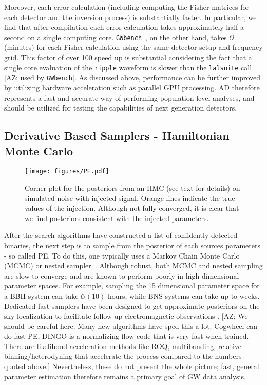 \documentclass[twocolumn]{aastex631}
\newcommand{\ripple}{\texttt{ripple}\xspace}
\newcommand{\lalsuite}{\texttt{lalsuite}\xspace}
\newcommand{\AZ}[1]{{\color{Burnt}[AZ: #1]}}
\begin{document}
Moreover, each error calculation (including computing the Fisher matrices for each detector and the inversion process) is substantially faster.
In particular, we find that after compilation each error calculation takes approximately half a second on a single computing core.
\texttt{GWbench}~\citep{Borhanian:2020ypi}, on the other hand, takes $\mathcal{O}$(minutes) for each Fisher calculation using the same detector setup and frequency grid.
This factor of over 100 speed up is substantial considering the fact that a single core evaluation of the \ripple waveform is slower than the \lalsuite call \AZ{used by \texttt{GWbench}}.
As discussed above, performance can be further improved by utilizing hardware acceleration such as parallel GPU processing.
AD therefore represents a fast and accurate way of performing population level analyses, and should be utilized for testing the capabilities of next generation detectors.

\subsection{Derivative Based Samplers - Hamiltonian Monte Carlo}
\label{subsec:hmc}

\begin{figure*}[t]
    \centering
    \texttt{[image: figures/PE.pdf]}
    \caption{
        Corner plot for the posteriors from an HMC (see text for details) on simulated noise with injected signal. 
        Orange lines indicate the true values of the injection. 
        Although not fully converged, it is clear that we find posteriors consistent with the injected parameters. 
    }
    \label{fig:corner}
\end{figure*}

After the search algorithms have constructed a list of confidently detected binaries, the next step is to sample from the posterior of each sources parameters - so called PE.
To do this, one typically uses a Markov Chain Monte Carlo (MCMC) or nested sampler~\citep{multinest, dynesty}.
Although robust, both MCMC and nested sampling are slow to converge and are known to perform poorly in high dimensional parameter spaces.
For example, sampling the 15 dimensional parameter space for a BBH system can take $\mathcal{O}(10)$ hours, while BNS systems can take up to weeks.
Dedicated fast samplers have been designed to get approximate posteriors on the sky localization to facilitate follow-up electromagnetic observations \citep[e.g.~\texttt{BAYESTAR}][]{Singer:2015ema}.
\AZ{We should be careful here. Many new algorithms have sped this a lot. Cogwheel can do fast PE, DINGO is a normalizing flow code that is very fast when trained. There are likelihood acceleration methods like ROQ, multibanding, relative binning/heterodyning that accelerate the process compared to the numbers quoted above.}
Nevertheless, these do not present the whole picture; fast, general parameter estimation therefore remains a primary goal of GW data analysis.
\end{document}
